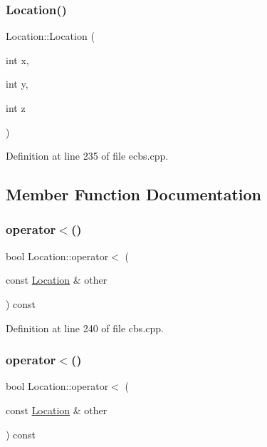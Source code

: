 \subsubsection{\texorpdfstring{Location()}{Location()}\hspace{0.1cm}{\footnotesize\ttfamily [2/2]}}
{\footnotesize\ttfamily Location\+::\+Location (\begin{DoxyParamCaption}\item[{int}]{x,  }\item[{int}]{y,  }\item[{int}]{z }\end{DoxyParamCaption})\hspace{0.3cm}{\ttfamily [inline]}}



Definition at line 235 of file ecbs.\+cpp.



\subsection{Member Function Documentation}
\mbox{\label{struct_location_af22acefb6d1dd7de7482915b1c2eae5d}} 
\subsubsection{\texorpdfstring{operator$<$()}{operator<()}\hspace{0.1cm}{\footnotesize\ttfamily [1/2]}}
{\footnotesize\ttfamily bool Location\+::operator$<$ (\begin{DoxyParamCaption}\item[{const \hyperlink{struct_location}{Location} \&}]{other }\end{DoxyParamCaption}) const\hspace{0.3cm}{\ttfamily [inline]}}



Definition at line 240 of file cbs.\+cpp.

\mbox{\label{struct_location_af22acefb6d1dd7de7482915b1c2eae5d}} 
\subsubsection{\texorpdfstring{operator$<$()}{operator<()}\hspace{0.1cm}{\footnotesize\ttfamily [2/2]}}
{\footnotesize\ttfamily bool Location\+::operator$<$ (\begin{DoxyParamCaption}\item[{const \hyperlink{struct_location}{Location} \&}]{other }\end{DoxyParamCaption}) const\hspace{0.3cm}{\ttfamily [inline]}}



